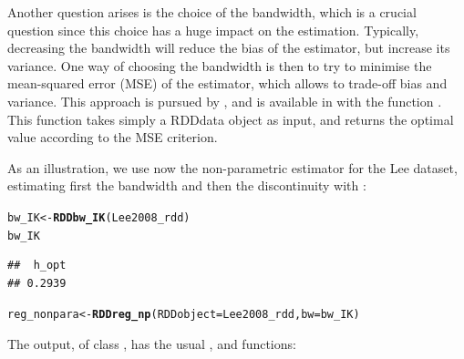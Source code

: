 \documentclass[english,nojss]{jss}\usepackage{graphicx, color}
\makeatletter
\newcommand{\hlfunctioncall}[1]{\textcolor[rgb]{0.501960784313725,0,0.329411764705882}{\textbf{#1}}}%
\newenvironment{kframe}{%
 \def\at@end@of@kframe{}%
 \ifinner\ifhmode%
  \def\at@end@of@kframe{\end{minipage}}%
  \begin{minipage}{\columnwidth}%
 \fi\fi%
 \def\FrameCommand##1{\hskip\@totalleftmargin \hskip-\fboxsep
 \colorbox{shadecolor}{##1}\hskip-\fboxsep
     \hskip-\linewidth \hskip-\@totalleftmargin \hskip\columnwidth}%
 \MakeFramed {\advance\hsize-\width
   \@totalleftmargin\z@ \linewidth\hsize
   \@setminipage}}%
 {\par\unskip\endMakeFramed%
 \at@end@of@kframe}
\newenvironment{knitrout}{}{} %
\makeatother
\begin{document}
Another question arises is the choice of the bandwidth, which is a
crucial question since this choice has a huge impact on the estimation.
Typically, decreasing the bandwidth will reduce the bias of the estimator,
but increase its variance. One way of choosing the bandwidth is then
to try to minimise the mean-squared error (MSE) of the estimator,
which allows to trade-off bias and variance. This approach is pursued
by \citet{ImbensKalyanaraman2012}, and is available in 
with the function . This function takes simply a
RDDdata object as input, and returns the optimal value according to
the MSE criterion. 

As an illustration, we use now the non-parametric estimator for the
Lee dataset, estimating first the bandwidth and then the discontinuity
with :

\begin{knitrout}
\color{fgcolor}\begin{kframe}
\begin{alltt}
bw_IK <- \hlfunctioncall{RDDbw_IK}(Lee2008_rdd)
bw_IK
\end{alltt}
\begin{verbatim}
##  h_opt 
## 0.2939
\end{verbatim}
\begin{alltt}
reg_nonpara <- \hlfunctioncall{RDDreg_np}(RDDobject = Lee2008_rdd, bw = bw_IK)
\end{alltt}
\end{kframe}
\end{knitrout}


The output, of class , has the usual ,
 and  functions:
\end{document}
